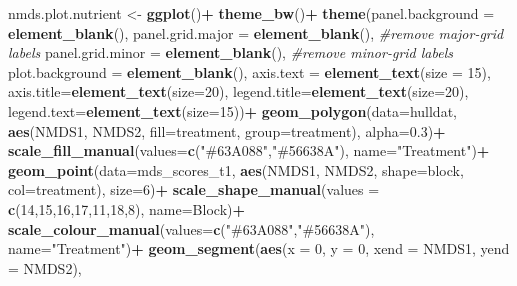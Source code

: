 \documentclass[
]{article}
\newenvironment{Shaded}{\begin{snugshade}}{\end{snugshade}}
\newcommand{\AttributeTok}[1]{\textcolor[rgb]{0.13,0.29,0.53}{#1}}
\newcommand{\CommentTok}[1]{\textcolor[rgb]{0.56,0.35,0.01}{\textit{#1}}}
\newcommand{\DecValTok}[1]{\textcolor[rgb]{0.00,0.00,0.81}{#1}}
\newcommand{\FloatTok}[1]{\textcolor[rgb]{0.00,0.00,0.81}{#1}}
\newcommand{\FunctionTok}[1]{\textcolor[rgb]{0.13,0.29,0.53}{\textbf{#1}}}
\newcommand{\NormalTok}[1]{#1}
\newcommand{\OtherTok}[1]{\textcolor[rgb]{0.56,0.35,0.01}{#1}}
\newcommand{\SpecialCharTok}[1]{\textcolor[rgb]{0.81,0.36,0.00}{\textbf{#1}}}
\newcommand{\StringTok}[1]{\textcolor[rgb]{0.31,0.60,0.02}{#1}}
\begin{document}
\begin{Shaded}
\begin{Highlighting}[]
\NormalTok{nmds.plot.nutrient }\OtherTok{\textless{}{-}} \FunctionTok{ggplot}\NormalTok{()}\SpecialCharTok{+}
  \FunctionTok{theme\_bw}\NormalTok{()}\SpecialCharTok{+}
  \FunctionTok{theme}\NormalTok{(}\AttributeTok{panel.background =} \FunctionTok{element\_blank}\NormalTok{(),}
        \AttributeTok{panel.grid.major =} \FunctionTok{element\_blank}\NormalTok{(),  }\CommentTok{\#remove major{-}grid labels}
        \AttributeTok{panel.grid.minor =} \FunctionTok{element\_blank}\NormalTok{(),  }\CommentTok{\#remove minor{-}grid labels}
        \AttributeTok{plot.background =} \FunctionTok{element\_blank}\NormalTok{(), }
        \AttributeTok{axis.text =} \FunctionTok{element\_text}\NormalTok{(}\AttributeTok{size =} \DecValTok{15}\NormalTok{),}
        \AttributeTok{axis.title=}\FunctionTok{element\_text}\NormalTok{(}\AttributeTok{size=}\DecValTok{20}\NormalTok{),}
        \AttributeTok{legend.title=}\FunctionTok{element\_text}\NormalTok{(}\AttributeTok{size=}\DecValTok{20}\NormalTok{), }
        \AttributeTok{legend.text=}\FunctionTok{element\_text}\NormalTok{(}\AttributeTok{size=}\DecValTok{15}\NormalTok{))}\SpecialCharTok{+}
  \FunctionTok{geom\_polygon}\NormalTok{(}\AttributeTok{data=}\NormalTok{hulldat, }\FunctionTok{aes}\NormalTok{(NMDS1, NMDS2, }\AttributeTok{fill=}\NormalTok{treatment, }\AttributeTok{group=}\NormalTok{treatment), }\AttributeTok{alpha=}\FloatTok{0.3}\NormalTok{)}\SpecialCharTok{+}
  \FunctionTok{scale\_fill\_manual}\NormalTok{(}\AttributeTok{values=}\FunctionTok{c}\NormalTok{(}\StringTok{"\#63A088"}\NormalTok{,}\StringTok{"\#56638A"}\NormalTok{), }\AttributeTok{name=}\StringTok{"Treatment"}\NormalTok{)}\SpecialCharTok{+}
  \FunctionTok{geom\_point}\NormalTok{(}\AttributeTok{data=}\NormalTok{mds\_scores\_t1, }\FunctionTok{aes}\NormalTok{(NMDS1, NMDS2, }\AttributeTok{shape=}\NormalTok{block, }\AttributeTok{col=}\NormalTok{treatment), }\AttributeTok{size=}\DecValTok{6}\NormalTok{)}\SpecialCharTok{+} 
  \FunctionTok{scale\_shape\_manual}\NormalTok{(}\AttributeTok{values =} \FunctionTok{c}\NormalTok{(}\DecValTok{14}\NormalTok{,}\DecValTok{15}\NormalTok{,}\DecValTok{16}\NormalTok{,}\DecValTok{17}\NormalTok{,}\DecValTok{11}\NormalTok{,}\DecValTok{18}\NormalTok{,}\DecValTok{8}\NormalTok{), }\AttributeTok{name=}\StringTok{\textquotesingle{}Block\textquotesingle{}}\NormalTok{)}\SpecialCharTok{+}
  \FunctionTok{scale\_colour\_manual}\NormalTok{(}\AttributeTok{values=}\FunctionTok{c}\NormalTok{(}\StringTok{"\#63A088"}\NormalTok{,}\StringTok{"\#56638A"}\NormalTok{), }\AttributeTok{name=}\StringTok{"Treatment"}\NormalTok{)}\SpecialCharTok{+}
  \FunctionTok{geom\_segment}\NormalTok{(}\FunctionTok{aes}\NormalTok{(}\AttributeTok{x =} \DecValTok{0}\NormalTok{, }\AttributeTok{y =} \DecValTok{0}\NormalTok{, }\AttributeTok{xend =}\NormalTok{ NMDS1, }\AttributeTok{yend =}\NormalTok{ NMDS2), }

\end{Highlighting}
\end{Shaded}
\end{document}
